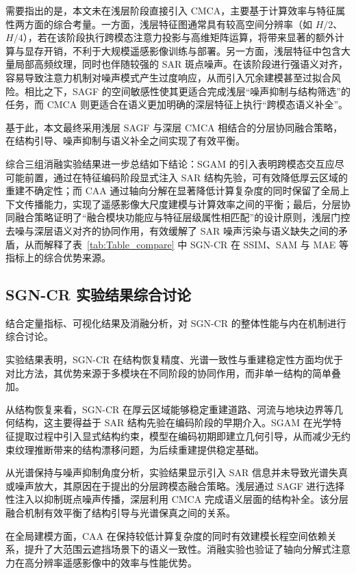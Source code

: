 需要指出的是，本文未在浅层阶段直接引入 CMCA，主要基于计算效率与特征属性两方面的综合考量。一方面，浅层特征图通常具有较高空间分辨率（如 $H/2$、$H/4$），若在该阶段执行跨模态注意力投影与高维矩阵运算，将带来显著的额外计算与显存开销，不利于大规模遥感影像训练与部署。另一方面，浅层特征中包含大量局部高频纹理，同时也伴随较强的 SAR 斑点噪声。在该阶段进行强语义对齐，容易导致注意力机制对噪声模式产生过度响应，从而引入冗余建模甚至过拟合风险。相比之下，SAGF 的空间敏感性使其更适合完成浅层“噪声抑制与结构筛选”的任务，而 CMCA 则更适合在语义更加明确的深层特征上执行“跨模态语义补全”。

基于此，本文最终采用浅层 SAGF 与深层 CMCA 相结合的分层协同融合策略，在结构引导、噪声抑制与语义补全之间实现了有效平衡。

综合三组消融实验结果进一步总结如下结论：SGAM 的引入表明跨模态交互应尽可能前置，通过在特征编码阶段显式注入 SAR 结构先验，可有效降低厚云区域的重建不确定性；而 CAA 通过轴向分解在显著降低计算复杂度的同时保留了全局上下文传播能力，实现了遥感影像大尺度建模与计算效率之间的平衡；最后，分层协同融合策略证明了“融合模块功能应与特征层级属性相匹配”的设计原则，浅层门控去噪与深层语义对齐的协同作用，有效缓解了 SAR 噪声污染与语义缺失之间的矛盾，从而解释了表~\ref{tab:Table_compare} 中 SGN-CR 在 SSIM、SAM 与 MAE 等指标上的综合优势来源。

\subsection{SGN-CR 实验结果综合讨论}

结合定量指标、可视化结果及消融分析，对 SGN-CR 的整体性能与内在机制进行综合讨论。

实验结果表明，SGN-CR 在结构恢复精度、光谱一致性与重建稳定性方面均优于对比方法，其优势来源于多模块在不同阶段的协同作用，而非单一结构的简单叠加。

从结构恢复来看，SGN-CR 在厚云区域能够稳定重建道路、河流与地块边界等几何结构，这主要得益于 SAR 结构先验在编码阶段的早期介入。SGAM 在光学特征提取过程中引入显式结构约束，模型在编码初期即建立几何引导，从而减少无约束纹理推断带来的结构漂移问题，为后续重建提供稳定基础。

从光谱保持与噪声抑制角度分析，实验结果显示引入 SAR 信息并未导致光谱失真或噪声放大，其原因在于提出的分层跨模态融合策略。浅层通过 SAGF 进行选择性注入以抑制斑点噪声传播，深层利用 CMCA 完成语义层面的结构补全。该分层融合机制有效平衡了结构引导与光谱保真之间的关系。

在全局建模方面，CAA 在保持较低计算复杂度的同时有效建模长程空间依赖关系，提升了大范围云遮挡场景下的语义一致性。消融实验也验证了轴向分解式注意力在高分辨率遥感影像中的效率与性能优势。

